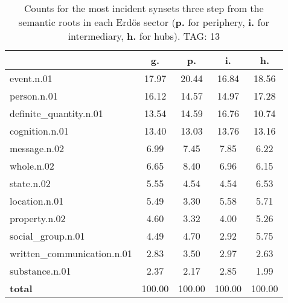 \begin{table}[h!]
\begin{center}
\begin{tabular}{| l | c | c | c | c |}\hline
 & g. & p. & i. & h. \\\hline
event.n.01 & 17.97  & 20.44  & 16.84  & 18.56 \\\hline
person.n.01 & 16.12  & 14.57  & 14.97  & 17.28 \\\hline
definite\_quantity.n.01 & 13.54  & 14.59  & 16.76  & 10.74 \\\hline
cognition.n.01 & 13.40  & 13.03  & 13.76  & 13.16 \\\hline
message.n.02 & 6.99  & 7.45  & 7.85  & 6.22 \\\hline
whole.n.02 & 6.65  & 8.40  & 6.96  & 6.15 \\\hline
state.n.02 & 5.55  & 4.54  & 4.54  & 6.53 \\\hline
location.n.01 & 5.49  & 3.30  & 5.58  & 5.71 \\\hline
property.n.02 & 4.60  & 3.32  & 4.00  & 5.26 \\\hline
social\_group.n.01 & 4.49  & 4.70  & 2.92  & 5.75 \\\hline
written\_communication.n.01 & 2.83  & 3.50  & 2.97  & 2.63 \\\hline
substance.n.01 & 2.37  & 2.17  & 2.85  & 1.99 \\\hline
{{\bf total}} & 100.00  & 100.00  & 100.00  & 100.00 \\\hline
\end{tabular}
\caption{Counts for the most incident synsets three step from the semantic roots in each Erd\"os sector ({\bf p.} for periphery, {\bf i.} for intermediary, {\bf h.} for hubs). TAG: 13}
\end{center}
\end{table}